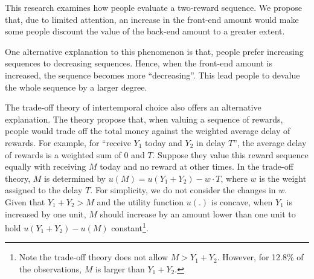 \documentclass[
  12pt,
]{article}
\begin{document}
This research examines how people evaluate a two-reward sequence. We
propose that, due to limited attention, an increase in the front-end
amount would make some people discount the value of the back-end amount
to a greater extent.

One alternative explanation to this phenomenon is that, people prefer
increasing sequences to decreasing sequences. Hence, when the front-end
amount is increased, the sequence becomes more ``decreasing''. This lead
people to devalue the whole sequence by a larger degree.

The trade-off theory of intertemporal choice also offers an alternative
explanation\citep{read2012tradeoffs, scholten2023unified}. The theory
propose that, when valuing a sequence of rewards, people would trade off
the total money against the weighted average delay of rewards. For
example, for ``receive \(Y_1\) today and \(Y_2\) in delay \(T\)'', the
average delay of rewards is a weighted sum of 0 and \(T\). Suppose they
value this reward sequence equally with receiving \(M\) today and no
reward at other times. In the trade-off theory, \(M\) is determined by
\(u(M)=u(Y_1+Y_2)- w\cdot T\), where \(w\) is the weight assigned to the
delay \(T\). For simplicity, we do not consider the changes in \(w\).
Given that \(Y_1 + Y_2 > M\) and the utility function \(u(.)\) is
concave, when \(Y_1\) is increased by one unit, \(M\) should increase by
an amount lower than one unit to hold \(u(Y_1 + Y_2) - u(M)\)
constant\footnote{Note the trade-off theory does not allow
  \(M > Y_1 + Y_2\). However, for 12.8\% of the observations, \(M\) is
  larger than \(Y_1 + Y_2\).}.

\renewcommand\refname{Reference}
  
\end{document}
